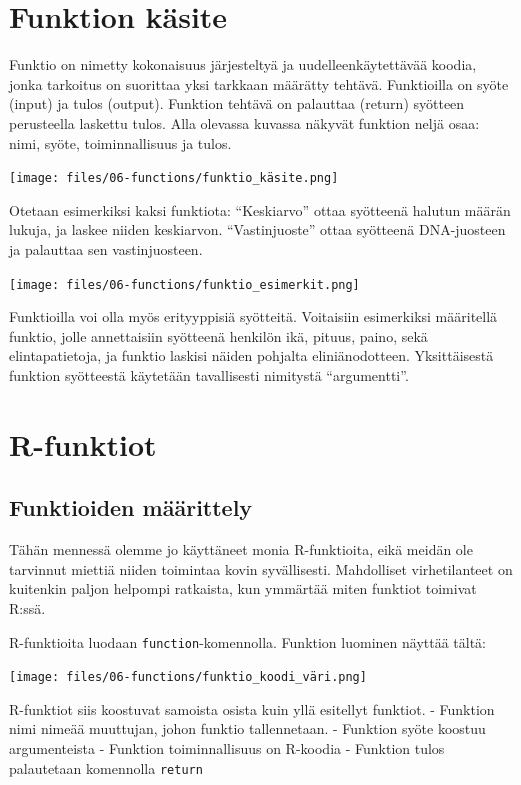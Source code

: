 \documentclass[
]{book}
\begin{document}
\hypertarget{funktion-kuxe4site}{%
\section{Funktion käsite}\label{funktion-kuxe4site}}

Funktio on nimetty kokonaisuus järjesteltyä ja uudelleenkäytettävää koodia, jonka tarkoitus on suorittaa yksi tarkkaan määrätty tehtävä. Funktioilla on syöte (input) ja tulos (output). Funktion tehtävä on palauttaa (return) syötteen perusteella laskettu tulos. Alla olevassa kuvassa näkyvät funktion neljä osaa: nimi, syöte, toiminnallisuus ja tulos.

\texttt{[image: files/06-functions/funktio\_käsite.png]}

Otetaan esimerkiksi kaksi funktiota: ``Keskiarvo'' ottaa syötteenä halutun määrän lukuja, ja laskee niiden keskiarvon. ``Vastinjuoste'' ottaa syötteenä DNA-juosteen ja palauttaa sen vastinjuosteen.

\texttt{[image: files/06-functions/funktio\_esimerkit.png]}

Funktioilla voi olla myös erityyppisiä syötteitä. Voitaisiin esimerkiksi määritellä funktio, jolle annettaisiin syötteenä henkilön ikä, pituus, paino, sekä elintapatietoja, ja funktio laskisi näiden pohjalta eliniänodotteen. Yksittäisestä funktion syötteestä käytetään tavallisesti nimitystä ``argumentti''.

\hypertarget{r-funktiot}{%
\section{R-funktiot}\label{r-funktiot}}

\hypertarget{funktioiden-muxe4uxe4rittely}{%
\subsection{Funktioiden määrittely}\label{funktioiden-muxe4uxe4rittely}}

Tähän mennessä olemme jo käyttäneet monia R-funktioita, eikä meidän ole tarvinnut miettiä niiden toimintaa kovin syvällisesti. Mahdolliset virhetilanteet on kuitenkin paljon helpompi ratkaista, kun ymmärtää miten funktiot toimivat R:ssä.

R-funktioita luodaan \texttt{function}-komennolla. Funktion luominen näyttää tältä:

\texttt{[image: files/06-functions/funktio\_koodi\_väri.png]}

R-funktiot siis koostuvat samoista osista kuin yllä esitellyt funktiot.
- Funktion nimi nimeää muuttujan, johon funktio tallennetaan.
- Funktion syöte koostuu argumenteista
- Funktion toiminnallisuus on R-koodia
- Funktion tulos palautetaan komennolla \texttt{return}
\end{document}
